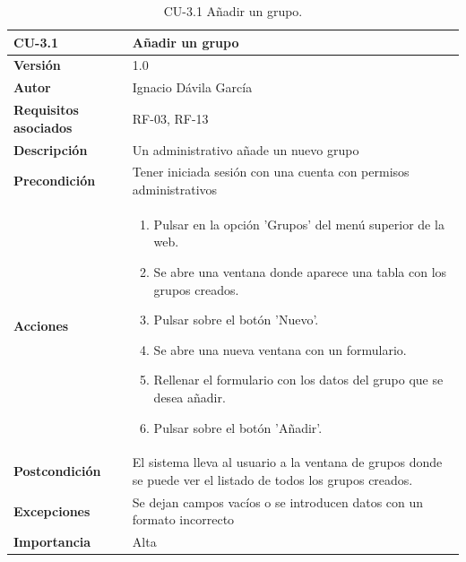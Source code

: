 \begin{table}[p]
	\centering
	\begin{tabularx}{\linewidth}{ p{} p{} }
		\toprule
		\textbf{CU-3.1}    & \textbf{Añadir un grupo}\\
		\toprule
		\textbf{Versión}              & 1.0    \\
		\textbf{Autor}                & Ignacio Dávila García \\
		\textbf{Requisitos asociados} & RF-03, RF-13 \\
		\textbf{Descripción}          & Un administrativo añade un nuevo grupo \\
		\textbf{Precondición}         & Tener iniciada sesión con una cuenta con permisos administrativos \\
		\textbf{Acciones}             &
		\begin{enumerate}
			\def\labelenumi{\arabic{enumi}.}
			\tightlist
			\item Pulsar en la opción 'Grupos' del menú superior de la web.
			\item Se abre una ventana donde aparece una tabla con los grupos creados.
			\item Pulsar sobre el botón 'Nuevo'.
			\item Se abre una nueva ventana con un formulario.
			\item Rellenar el formulario con los datos del grupo que se desea añadir.
			\item Pulsar sobre el botón 'Añadir'.
		\end{enumerate}\\
		\textbf{Postcondición}        & El sistema lleva al usuario a la ventana de grupos donde se puede ver el listado de todos los grupos creados. \\
		\textbf{Excepciones}          & Se dejan campos vacíos o se introducen datos con un formato incorrecto \\
		\textbf{Importancia}          & Alta \\
		\bottomrule
	\end{tabularx}
	\caption{CU-3.1 Añadir un grupo.}
\end{table}

